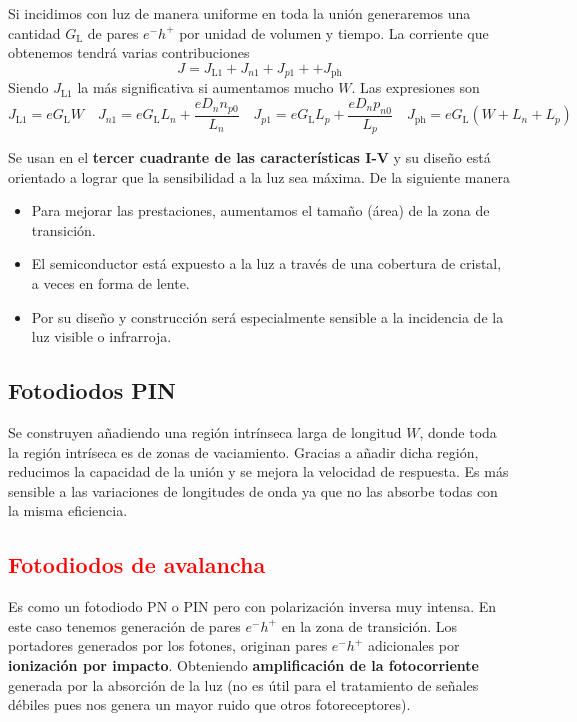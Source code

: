 Si incidimos con luz de manera uniforme en toda la unión generaremos una cantidad $G_\mathrm{L}$ de pares $e^-h^+$ por unidad de volumen y tiempo. La corriente que obtenemos tendrá varias contribuciones
$$J=J_\mathrm{L1}+J_{n1}+J_{p1}++J_\mathrm{ph}$$
Siendo $J_\mathrm{L1}$ la más significativa si aumentamos mucho $W$. Las expresiones son 
\begin{equation*}
    J_\mathrm{L1}=eG_\mathrm{L}W \quad J_{n1}=eG_\mathrm{L}L_n+\frac{eD_nn_{p0}}{L_n} \quad  J_{p1}=eG_\mathrm{L}L_p+\frac{eD_np_{n0}}{L_p} \quad 
    J_\mathrm{ph}=eG_\mathrm{L}(W+L_n+L_p)
\end{equation*}

Se usan en el \textbf{tercer cuadrante de las características I-V} y su diseño está orientado a lograr que la sensibilidad a la luz sea máxima. De la siguiente manera
\begin{itemize}
    \item Para mejorar las prestaciones, aumentamos el tamaño (área) de la zona de transición.
    \item El semiconductor está expuesto a la luz a través de una cobertura de cristal, a veces en forma de lente.
    \item Por su diseño y construcción será especialmente sensible a la incidencia de la luz visible o infrarroja.
\end{itemize}
\subsection{Fotodiodos PIN}
Se construyen añadiendo una región intrínseca larga de longitud $W$, donde toda la región intríseca es de zonas de vaciamiento. Gracias a añadir dicha región, reducimos la capacidad de la unión y se mejora la velocidad de respuesta. Es más sensible a las variaciones de longitudes de onda ya que no las absorbe todas con la misma eficiencia.
\subsection{\textcolor{red}{Fotodiodos de avalancha}}
Es como un fotodiodo PN o PIN pero con polarización inversa muy intensa. En este caso tenemos generación de pares $e^-h^+$ en la zona de transición. Los portadores generados por los fotones, originan pares $e^-h^+$ adicionales por \textbf{ionización por impacto}. Obteniendo \textbf{amplificación de la fotocorriente} generada por la absorción de la luz (no es útil para el tratamiento de señales débiles pues nos genera un mayor ruido que otros fotoreceptores).
